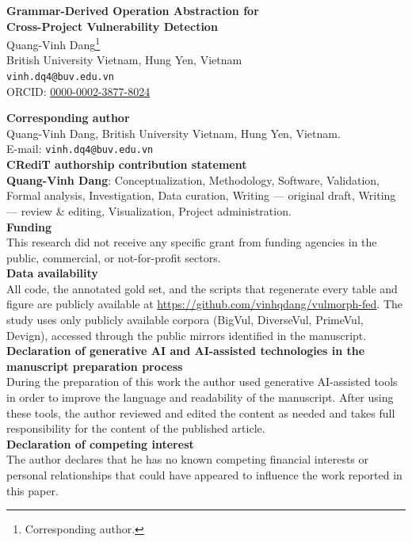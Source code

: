 \documentclass[11pt]{article}
\begin{document}
\begin{center}
{\LARGE\bfseries Grammar-Derived Operation Abstraction for\\[2pt]
Cross-Project Vulnerability Detection}\\[2em]

{\large Quang-Vinh Dang\footnote{Corresponding author.}}\\[0.6em]
British University Vietnam, Hung Yen, Vietnam\\[0.3em]
\texttt{vinh.dq4@buv.edu.vn}\\[0.3em]
ORCID: \href{https://orcid.org/0000-0002-3877-8024}{0000-0002-3877-8024}
\end{center}

\vspace{2em}

\noindent\textbf{Corresponding author}\\
Quang-Vinh Dang, British University Vietnam, Hung Yen, Vietnam.\\
E-mail: \texttt{vinh.dq4@buv.edu.vn}\\[1.5em]

\noindent\textbf{CRediT authorship contribution statement}\\[0.5em]
\textbf{Quang-Vinh Dang}: Conceptualization, Methodology, Software,
Validation, Formal analysis, Investigation, Data curation, Writing --- original
draft, Writing --- review \& editing, Visualization, Project administration.\\[1.5em]

\noindent\textbf{Funding}\\[0.5em]
This research did not receive any specific grant from funding agencies in the
public, commercial, or not-for-profit sectors.\\[1.5em]

\noindent\textbf{Data availability}\\[0.5em]
All code, the annotated gold set, and the scripts that regenerate every table
and figure are publicly available at
\url{https://github.com/vinhqdang/vulmorph-fed}. The study uses only publicly
available corpora (BigVul, DiverseVul, PrimeVul, Devign), accessed through the
public mirrors identified in the manuscript.\\[1.5em]

\noindent\textbf{Declaration of generative AI and AI-assisted technologies in
the manuscript preparation process}\\[0.5em]
During the preparation of this work the author used generative AI-assisted
tools in order to improve the language and readability of the manuscript. After
using these tools, the author reviewed and edited the content as needed and
takes full responsibility for the content of the published article.\\[1.5em]

\noindent\textbf{Declaration of competing interest}\\[0.5em]
The author declares that he has no known competing financial interests or
personal relationships that could have appeared to influence the work reported
in this paper.
\end{document}
